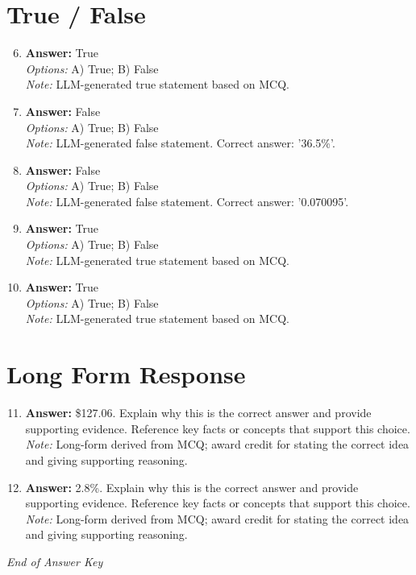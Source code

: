 \documentclass[12pt]{article}
\begin{document}
\section*{True / False}
\begin{enumerate}[label=\arabic*.]
\setcounter{enumi}{5}
\item \textbf{Answer:} True
\\ \textit{Options:} A) True; B) False
\\ \textit{Note:} LLM-generated true statement based on MCQ.
\item \textbf{Answer:} False
\\ \textit{Options:} A) True; B) False
\\ \textit{Note:} LLM-generated false statement. Correct answer: '36.5\%'.
\item \textbf{Answer:} False
\\ \textit{Options:} A) True; B) False
\\ \textit{Note:} LLM-generated false statement. Correct answer: '0.070095'.
\item \textbf{Answer:} True
\\ \textit{Options:} A) True; B) False
\\ \textit{Note:} LLM-generated true statement based on MCQ.
\item \textbf{Answer:} True
\\ \textit{Options:} A) True; B) False
\\ \textit{Note:} LLM-generated true statement based on MCQ.
\end{enumerate}

\section*{Long Form Response}
\begin{enumerate}[label=\arabic*.]
\setcounter{enumi}{10}
\item \textbf{Answer:} \$127.06. Explain why this is the correct answer and provide supporting evidence. Reference key facts or concepts that support this choice.
\\ \textit{Note:} Long-form derived from MCQ; award credit for stating the correct idea and giving supporting reasoning.
\item \textbf{Answer:} 2.8\%. Explain why this is the correct answer and provide supporting evidence. Reference key facts or concepts that support this choice.
\\ \textit{Note:} Long-form derived from MCQ; award credit for stating the correct idea and giving supporting reasoning.
\end{enumerate}

\vfill
\noindent\textit{End of Answer Key}
\end{document}
